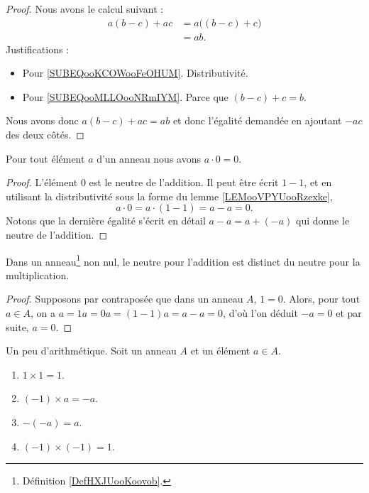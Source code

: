 \begin{proof}
    Nous avons le calcul suivant :
    \begin{subequations}
        \begin{align}
            a(b-c)+ac&=a\big( (b-c)+c \big)     \label{SUBEQooKCOWooFeOHUM}\\
            &=ab.       \label{SUBEQooMLLOooNRmIYM}
        \end{align}
    \end{subequations}
    Justifications :
    \begin{itemize}
        \item Pour \ref{SUBEQooKCOWooFeOHUM}. Distributivité.
        \item Pour \ref{SUBEQooMLLOooNRmIYM}. Parce que \( (b-c)+c=b\).
    \end{itemize}
    Nous avons donc \( a(b-c)+ac=ab\) et donc l'égalité demandée en ajoutant \( -ac\) des deux côtés.
\end{proof}

\begin{lemma}       \label{LEMooVUSMooWisQpD}
    Pour tout élément \( a\) d'un anneau nous avons \( a\cdot 0=0\).
\end{lemma}

\begin{proof}
    L'élément \( 0\) est le neutre de l'addition. Il peut être écrit \( 1-1\), et en utilisant la distributivité sous la forme du lemme \ref{LEMooVPYUooRzexke},
    \begin{equation}
        a\cdot 0=a\cdot (1-1)=a-a=0.
    \end{equation}
    Notons que la dernière égalité s'écrit en détail \( a-a=a+(-a)\) qui donne le neutre de l'addition.
\end{proof}

\begin{proposition}     \label{PROPooNCCGooXjVyVt}
    Dans un anneau\footnote{Définition \ref{DefHXJUooKoovob}.} non nul, le neutre pour l'addition est distinct du neutre pour la multiplication.
\end{proposition}
\begin{proof}
    Supposons par contraposée que dans un anneau $A$, \( 1 = 0 \). Alors, pour tout \( a \in A \), on a \( a = 1a = 0a = (1 - 1)a = a - a=0 \), d'où l'on déduit \( -a = 0  \) et par suite, \( a = 0. \)
\end{proof}

\begin{lemma}        \label{LEMooLTERooVKgqjn}
    Un peu d'arithmétique. Soit un anneau \( A\) et un élément \( a\in A\).
    \begin{enumerate}
        \item       \label{ITEMooUGHCooOPgoeR}
            \( 1\times 1=1\).
        \item       \label{ITEMooJMBSooVgvVwg}
            \( (-1)\times a=-a\).
        \item       \label{ITEMooXJGMooKNLlHU}
            \( -(-a)=a\).
        \item       \label{ITEMooYMRKooHVYYKU}
            \( (-1)\times (-1)=1\).
    \end{enumerate}
\end{lemma}

